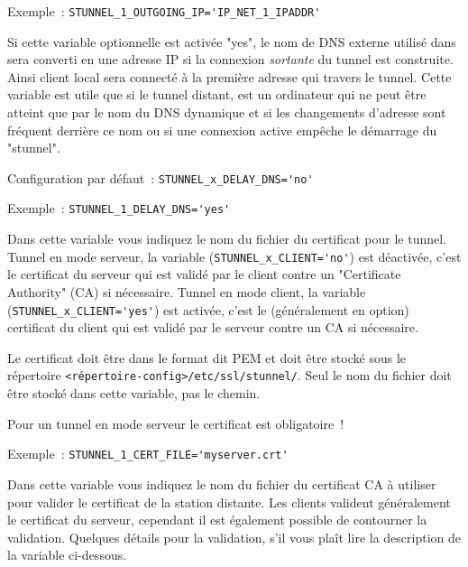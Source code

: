 \begin{description}
Exemple~: \verb+STUNNEL_1_OUTGOING_IP='IP_NET_1_IPADDR'+


Si cette variable optionnelle est activée "yes", le nom de DNS externe utilisé dans  
sera converti en une adresse IP si la connexion \emph{sortante} du tunnel est construite. Ainsi
client local sera connecté à la première adresse qui travers le tunnel. Cette variable est utile
que si le tunnel distant, est un ordinateur qui ne peut être atteint que par le nom du DNS dynamique
et si les changements d'adresse sont fréquent derrière ce nom ou si une connexion active empêche
le démarrage du "stunnel".

Configuration par défaut~: \verb+STUNNEL_x_DELAY_DNS='no'+

Exemple~: \verb+STUNNEL_1_DELAY_DNS='yes'+


Dans cette variable vous indiquez le nom du fichier du certificat pour le tunnel. Tunnel
en mode serveur, la variable (\verb+STUNNEL_x_CLIENT='no'+) est déactivée, c'est le certificat
du serveur qui est validé par le client contre un "Certificate Authority" (CA) si nécessaire.
Tunnel en mode client, la variable (\verb+STUNNEL_x_CLIENT='yes'+) est activée, c'est le
(généralement en option) certificat du client qui est validé par le serveur contre un CA si
nécessaire.

Le certificat doit être dans le format dit PEM et doit être stocké sous le répertoire
\texttt{<répertoire-config>/etc/ssl/stunnel/}. Seul le nom du fichier doit être stocké dans
cette variable, pas le chemin.

Pour un tunnel en mode serveur le certificat est obligatoire~!

Exemple~: \verb+STUNNEL_1_CERT_FILE='myserver.crt'+


Dans cette variable vous indiquez le nom du fichier du certificat CA à utiliser pour valider
le certificat de la station distante. Les clients valident généralement le certificat du serveur,
cependant il est également possible de contourner la validation. Quelques détails pour
la validation, s'il vous plaît lire la description de la variable 
{} ci-dessous.


\end{description}
